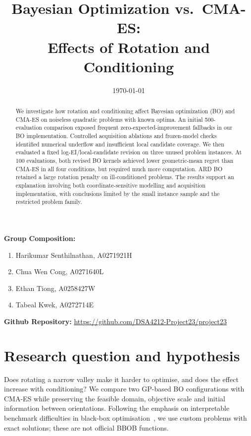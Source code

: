 \documentclass[12pt]{article}
\begin{document}
\title{Bayesian Optimization vs.\ CMA-ES:\\
Effects of Rotation and Conditioning}
\date{\today}
\maketitle

\noindent\textbf{Group Composition:}
\begin{enumerate}
    \item {Harikumar Senthilnathan}, A0271921H
    \item {Chua Wen Cong}, A0271640L
    \item {Ethan Tiong}, A0258427W
    \item {Tabeal Kwek}, A0272714E
\end{enumerate}

\noindent\textbf{Github Repository:}
\url{https://github.com/DSA4212-Project23/project23}


\begin{abstract}
We investigate how rotation and conditioning affect Bayesian optimization (BO)
and CMA-ES on noiseless quadratic problems with known optima. An initial
500-evaluation comparison exposed frequent zero-expected-improvement fallbacks
in our BO implementation. Controlled acquisition ablations and frozen-model
checks identified numerical underflow and insufficient local candidate coverage.
We then evaluated a fixed log-EI/local-candidate revision on three unused problem
instances. At 100 evaluations, both revised BO kernels achieved lower
geometric-mean regret than CMA-ES in all four conditions, but required much
more computation. ARD BO retained a large rotation penalty on ill-conditioned
problems. The results support an explanation involving both coordinate-sensitive
modelling and acquisition implementation, with conclusions limited by the small
instance sample and the restricted problem family.
\end{abstract}

\section{Research question and hypothesis}
Does rotating a narrow valley make it harder to optimise, and does the effect
increase with conditioning? We compare two GP-based BO configurations with
CMA-ES while preserving the feasible domain, objective scale and initial
information between orientations. Following the emphasis on interpretable
benchmark difficulties in black-box optimisation~\citep{bbob}, we use custom
problems with exact solutions; these are not official BBOB functions.
\end{document}
